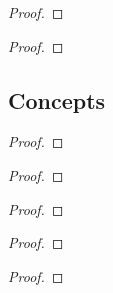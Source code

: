 \newpage
\begin{exercise}
\end{exercise}

\begin{proof}
\end{proof}

\newpage
\begin{exercise}
\end{exercise}

\begin{proof}
\end{proof}

\subsection*{Concepts}

\newpage
\begin{exercise}
\end{exercise}

\begin{proof}
\end{proof}

\newpage
\begin{exercise}
\end{exercise}

\begin{proof}
\end{proof}

\newpage
\begin{exercise}
\end{exercise}

\begin{proof}
\end{proof}

\newpage
\begin{exercise}
\end{exercise}

\begin{proof}
\end{proof}

\newpage
\begin{exercise}
\end{exercise}

\begin{proof}
\end{proof}

\newpage
\begin{exercise}
\end{exercise}

